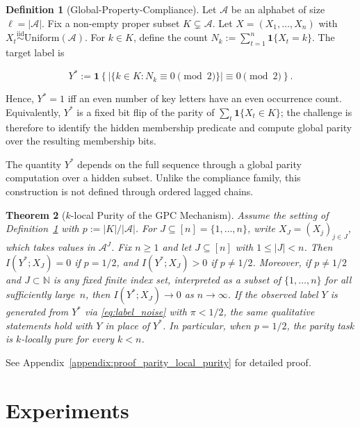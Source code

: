 \documentclass{article}
\theoremstyle{plain}
\newtheorem{theorem}{Theorem}[section]
\theoremstyle{definition}
\newtheorem{definition}[theorem]{Definition}
\theoremstyle{remark}
\begin{document}
\begin{definition}[Global-Property-Compliance]
\label{def:parity}
Let $\mathcal{A}$ be an alphabet of size $\ell = |\mathcal{A}|$. Fix a non-empty proper subset $K \subsetneq \mathcal{A}$. 
Let $X = (X_1,\ldots,X_n)$ with $X_t \overset{\mathrm{iid}}{\sim} \mathrm{Uniform}(\mathcal{A})$. 
For $k \in K$, define the count $N_k := \sum_{t=1}^n \mathbf{1}\{X_t = k\}$. 
The target label is

\[
Y^* := \mathbf{1}\!\left\{
\left|\{k\in K : N_k \equiv 0 \pmod 2\}\right|
\equiv 0 \pmod 2
\right\}.
\]

Hence, $Y^* = 1$ iff an even number of key letters have an even occurrence count. Equivalently, \(Y^*\) is a fixed bit flip of the parity of $\sum_t \mathbf{1}\{X_t\in K\}$; the challenge is therefore to identify the hidden membership predicate and compute global parity over the resulting membership bits.
\end{definition}

The quantity $Y^*$ depends on the full sequence through a global parity computation over a hidden subset. Unlike the compliance family, this construction is not defined through ordered lagged chains.

\begin{theorem}[$k$-local Purity of the GPC Mechanism]
\label{thm:parity_local_purity}
Assume the setting of Definition~\ref{def:parity} with
$p := |K|/|\mathcal{A}|$. For \(J\subseteq [n] = \{1, \ldots, n\}\), write
\(X_J=(X_j)_{j\in J}\), which takes values in \(\mathcal A^J\).
Fix $n\ge 1$ and let
$J \subseteq [n]$ with $1 \le |J| < n$. Then $I(Y^*;X_J)=0$ if $p = 1/2$, and $I(Y^*;X_J)>0$ if $p \neq 1/2$. Moreover, if $p\neq 1/2$ and $J\subset \mathbb{N}$ is any fixed finite index set, interpreted as a subset of $\{1,\ldots,n\}$ for all sufficiently large~$n$, then $I(Y^*;X_J)\to 0$ as
$n\to\infty$. If the observed label $Y$ is generated from $Y^*$ via
\eqref{eq:label_noise} with $\pi<1/2$, the same qualitative statements hold with $Y$ in place of $Y^*$. In particular, when $p=1/2$, the parity task is $k$-locally pure for every $k<n$.
\end{theorem}

See Appendix~\ref{appendix:proof_parity_local_purity} for detailed proof.



\section{Experiments}
\label{sec:experiments}
\end{document}

